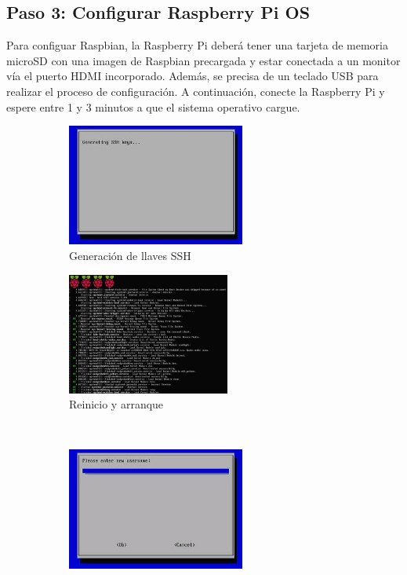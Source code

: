 \documentclass[letterpaper,10.5pt]{article}
\begin{document}
%
%
\clearpage
\subsection{Paso 3: Configurar Raspberry Pi OS}%
\label{sec:system-setup}
Para configuar Raspbian, la Raspberry Pi deberá tener una tarjeta de memoria microSD con una imagen de Raspbian precargada y estar conectada a un monitor vía el puerto HDMI incorporado.
Además, se precisa de un teclado USB para realizar el proceso de configuración.
A continuación, conecte la Raspberry Pi y espere entre 1 y 3 minutos a que el sistema operativo cargue.

\begin{figure}[H]
	\centering%
	\begin{subfigure}[b]{0.50\linewidth}
		\centering
		\includegraphics[width=0.9\linewidth,height=40mm,keepaspectratio]{img/p01-03-wizard-1.jpg} %
		\caption{Generación de llaves SSH}
		\label{fig:setup-wizard-step-1} %
	\end{subfigure}%
	\begin{subfigure}[b]{0.50\linewidth}
		\centering
		\includegraphics[width=0.9\linewidth,height=40mm,keepaspectratio]{img/p01-03-wizard-2.jpg} %
		\caption{Reinicio y arranque}
		\label{fig:setup-wizard-step-2} %
	\end{subfigure}\\
	\begin{subfigure}[b]{0.50\linewidth}
		\centering
		\includegraphics[width=0.9\linewidth,height=40mm,keepaspectratio]{img/p01-03-wizard-3.jpg} %

\end{subfigure}
\end{figure}
\end{document}
